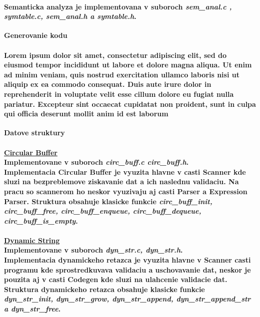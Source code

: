 \documentclass[12pt]{article}
\begin{document}
\paragraph{Semanticka analyza je implementovana v suboroch \textit{sem\_anal.c , symtable.c, sem\_anal.h a symtable.h}. \newline \\}

 \Large \textbf{Generovanie kodu} \normalsize \\
\noindent\makebox[\linewidth]{\rule{\textwidth}{0.4pt}}

\paragraph{Lorem ipsum dolor sit amet, consectetur adipiscing elit, sed do eiusmod tempor incididunt ut labore et dolore magna aliqua. Ut enim ad minim veniam, quis nostrud exercitation ullamco laboris nisi ut aliquip ex ea commodo consequat. Duis aute irure dolor in reprehenderit in voluptate velit esse cillum dolore eu fugiat nulla pariatur. Excepteur sint occaecat cupidatat non proident, sunt in culpa qui officia deserunt mollit anim id est laborum \newline \\}

 \Large \textbf{Datove struktury}\normalsize \\
\noindent\makebox[\linewidth]{\rule{\textwidth}{0.4pt}}

\paragraph{\large \underline{Circular Buffer} \\ Implementovane v suboroch \textit{circ\_buff.c circ\_buff.h}. \\ \newline
Implementacia Circular Buffer je vyuzita hlavne v casti Scanner kde sluzi na bezpreblemove ziskavanie dat a ich naslednu validaciu. Na pracu so scannerom ho neskor vyuzivaju aj casti Parser a Expression Parser. Struktura obsahuje klasicke funkcie \textit{circ\_buff\_init, circ\_buff\_free, circ\_buff\_enqueue, circ\_buff\_dequeue, circ\_buff\_is\_empty}. 
\newline \\}

\paragraph{\large \underline{Dynamic String} \\ Implementovane v suboroch \textit{dyn\_str.c, dyn\_str.h}. \\ \newline
Implementacia dynamickeho retazca je vyuzita hlavne v Scanner casti programu kde sprostredkuvava validaciu a uschovavanie dat, neskor je pouzita aj v casti Codegen kde sluzi na ulahcenie validacie dat. Struktura dynamickeho retazca obsahuje klasicke funkcie \textit{dyn\_str\_init, dyn\_str\_grow, dyn\_str\_append, dyn\_str\_append\_str a dyn\_str\_free}.  
\newline \\}
\end{document}
